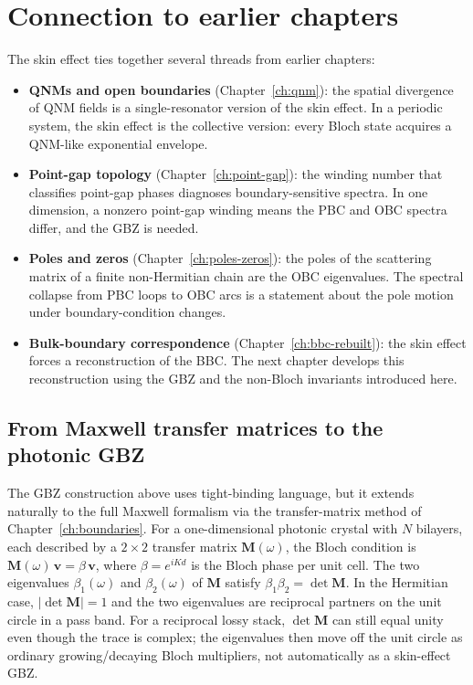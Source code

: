 \section{Connection to earlier chapters}
\label{sec:skin-connections}

The skin effect ties together several threads from earlier chapters:
\begin{itemize}
 \item \textbf{QNMs and open boundaries}
 (Chapter~\ref{ch:qnm}): the spatial divergence of QNM fields
 is a single-resonator version of the skin effect. In a periodic
 system, the skin effect is the collective version: every Bloch state
 acquires a QNM-like exponential envelope.
\item \textbf{Point-gap topology}
 (Chapter~\ref{ch:point-gap}): the winding number that classifies
 point-gap phases diagnoses boundary-sensitive spectra. In one
 dimension, a nonzero point-gap winding means the PBC and OBC spectra
 differ, and the GBZ is needed.
 \item \textbf{Poles and zeros}
 (Chapter~\ref{ch:poles-zeros}): the poles of the scattering
 matrix of a finite non-Hermitian chain are the OBC eigenvalues.
 The spectral collapse from PBC loops to OBC arcs is a statement
 about the pole motion under boundary-condition changes.
 \item \textbf{Bulk-boundary correspondence}
 (Chapter~\ref{ch:bbc-rebuilt}): the skin effect forces a
 reconstruction of the BBC. The next chapter develops this
 reconstruction using the GBZ and the non-Bloch invariants
 introduced here.
\end{itemize}

\subsection{From Maxwell transfer matrices to the photonic GBZ}
\label{ssec:maxwell-gbz}

The GBZ construction above uses tight-binding language, but it extends
naturally to the full Maxwell formalism via the transfer-matrix method
of Chapter~\ref{ch:boundaries}. For a one-dimensional photonic crystal
with $N$ bilayers, each described by a $2\times 2$ transfer matrix
$\mathbf{M}(\omega)$, the Bloch condition is
$\mathbf{M}(\omega)\,\mathbf{v} = \beta\,\mathbf{v}$, where $\beta = e^{iKd}$ is the
Bloch phase per unit cell. The two eigenvalues $\beta_1(\omega)$ and
$\beta_2(\omega)$ of $\mathbf{M}$ satisfy $\beta_1\beta_2 = \det\mathbf{M}$.
In the Hermitian case, $|\det\mathbf{M}| = 1$ and the two eigenvalues are
reciprocal partners on the unit circle in a pass band. For a reciprocal
lossy stack, $\det\mathbf{M}$ can still equal unity even though the
trace is complex; the eigenvalues then move off the unit circle as
ordinary growing/decaying Bloch multipliers, not automatically as a
skin-effect GBZ.

